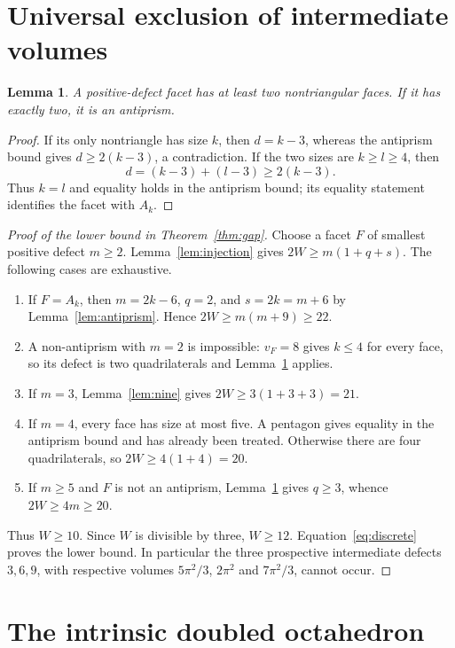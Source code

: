 \documentclass[11pt]{article}
\newtheorem{lemma}[theorem]{Lemma}
\theoremstyle{remark}
\begin{document}
\section{Universal exclusion of intermediate volumes}\label{sec:gap}
\begin{lemma}\label{lem:two}
A positive-defect facet has at least two nontriangular faces. If it
has exactly two, it is an antiprism.
\end{lemma}
\begin{proof}
If its only nontriangle has size $k$, then $d=k-3$, whereas the
antiprism bound gives $d\ge2(k-3)$, a contradiction. If the two sizes
are $k\ge l\ge4$, then
\[
 d=(k-3)+(l-3)\ge2(k-3).
\]
Thus $k=l$ and equality holds in the antiprism bound; its equality
statement identifies the facet with $A_k$.
\end{proof}

\begin{proof}[Proof of the lower bound in Theorem~\ref{thm:gap}]
Choose a facet $F$ of smallest positive defect $m\ge2$.
Lemma~\ref{lem:injection} gives $2W\ge m(1+q+s)$.
The following cases are exhaustive.
\begin{enumerate}
\item If $F=A_k$, then $m=2k-6$, $q=2$, and
$s=2k=m+6$ by Lemma~\ref{lem:antiprism}. Hence
$2W\ge m(m+9)\ge22$.
\item A non-antiprism with $m=2$ is impossible: $v_F=8$ gives
$k\le4$ for every face, so its defect is two quadrilaterals and
Lemma~\ref{lem:two} applies.
\item If $m=3$, Lemma~\ref{lem:nine} gives $2W\ge3(1+3+3)=21$.
\item If $m=4$, every face has size at most five. A pentagon gives
equality in the antiprism bound and has already been treated. Otherwise
there are four quadrilaterals, so $2W\ge4(1+4)=20$.
\item If $m\ge5$ and $F$ is not an antiprism,
Lemma~\ref{lem:two} gives $q\ge3$, whence $2W\ge4m\ge20$.
\end{enumerate}
Thus $W\ge10$. Since $W$ is divisible by three, $W\ge12$.
Equation~\eqref{eq:discrete} proves the lower bound. In particular the
three prospective intermediate defects $3,6,9$, with respective
volumes $5\pi^2/3$, $2\pi^2$ and $7\pi^2/3$, cannot occur.
\end{proof}

\section{The intrinsic doubled octahedron}\label{sec:doubled}
\end{document}
